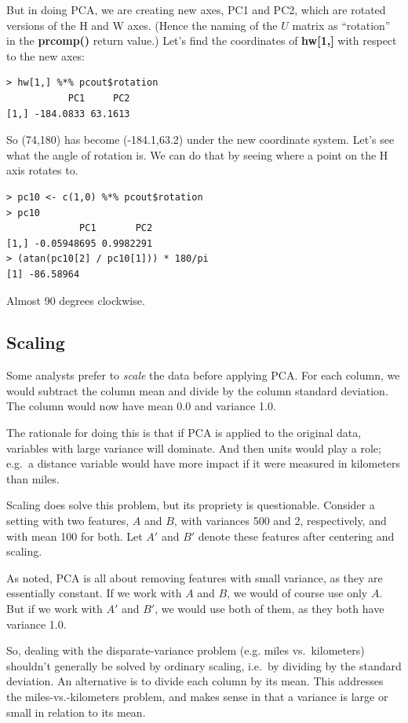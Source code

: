 But in doing PCA, we are creating new axes, PC1 and PC2, which are
rotated versions of the H and W axes.  (Hence the naming of the $U$
matrix as ``rotation'' in the \textbf{prcomp()} return value.)  Let's
find the coordinates of \textbf{hw[1,]} with respect to the new axes:

\begin{lstlisting}
> hw[1,] %*% pcout$rotation
           PC1     PC2
[1,] -184.0833 63.1613
\end{lstlisting}

So (74,180) has become (-184.1,63.2) under the new coordinate
system.  Let's see what the angle of rotation is. We can do that by
seeing where a point on the H axis rotates to.

\begin{lstlisting}
> pc10 <- c(1,0) %*% pcout$rotation
> pc10
             PC1       PC2
[1,] -0.05948695 0.9982291
> (atan(pc10[2] / pc10[1])) * 180/pi
[1] -86.58964
\end{lstlisting}

Almost 90 degrees clockwise.

\subsection{Scaling}

Some analysts prefer to \textit{scale} the data before applying PCA.
For each column, we would subtract the column mean and divide by the
column standard deviation.  The column would now have mean 0.0 and
variance 1.0.

The rationale for doing this is that if PCA is applied to the original
data, variables with large variance will dominate.  And then units would
play a role; e.g.\ a distance variable would have more impact if it were
measured in kilometers than miles.

Scaling does solve this problem, but its propriety is questionable.
Consider a setting with two features, $A$ and $B$, with variances 500
and 2, respectively, and with mean 100 for both.  Let $A'$ and $B'$
denote these features after centering and scaling.

As noted, PCA is all about removing features with small variance, as
they are essentially constant. If we work with $A$ and $B$, we would of
course use only $A$. But if we work with $A'$ and $B'$, we would use
both of them, as they both have variance 1.0.

So, dealing with the disparate-variance problem (e.g. miles vs.\
kilometers) shouldn't generally be solved by ordinary scaling, i.e.\ by
dividing by the standard deviation.  An alternative is to divide each
column by its mean.  This addresses the miles-vs.-kilometers problem,
and makes sense in that a variance is large or small in relation to its
mean.

